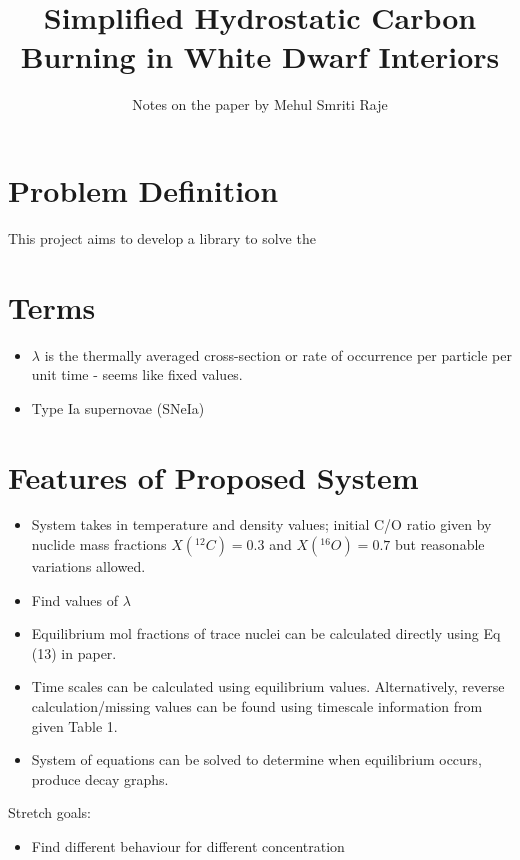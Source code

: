 \documentclass[11pt]{article}
\title{Simplified Hydrostatic Carbon Burning in White Dwarf Interiors}
\author{Notes on the paper by Mehul Smriti Raje}
\begin{document}
\maketitle{}

\section{Problem Definition}
This project aims to develop a library to solve the 

\section{Terms}
	\begin{itemize}
		\item $\lambda$ is the thermally averaged cross-section or rate of occurrence per particle per unit time - seems like fixed values.
		\item Type Ia supernovae (SNeIa)
	\end{itemize}

\section{Features of Proposed System}
	\begin{itemize}
		\item System takes in temperature and density values; initial C/O ratio given by nuclide mass fractions $X(^{12}C) = 0.3$ and $X(^{16}O) = 0.7$ but reasonable variations allowed.
		\item Find values of $\lambda$
		\item Equilibrium mol fractions of trace nuclei can be calculated directly using Eq (13) in paper.
		\item Time scales can be calculated using equilibrium values. Alternatively, reverse calculation/missing values can be found using timescale information from given Table 1.
		\item System of equations can be solved to determine when equilibrium occurs, produce decay graphs.
	\end{itemize}	
	
	Stretch goals:	
	\begin{itemize}
		\item Find different behaviour for different concentration 
	\end{itemize}
\end{document}
